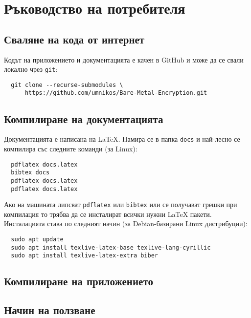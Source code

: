 \chapter{Ръководство на потребителя}
  \section{Сваляне на кода от интернет}
  Кодът на приложението и документацията е качен в GitHub и може да се свали локално чрез {\tt git}:
  \begin{lstlisting}
  git clone --recurse-submodules \
      https://github.com/umnikos/Bare-Metal-Encryption.git
  \end{lstlisting}

  \section{Компилиране на документацията}
  Документацията е написана на \LaTeX{}. Намира се в папка {\tt docs} и най-лесно се компилира със следните команди (за Linux):
  \begin{lstlisting}
  pdflatex docs.latex
  bibtex docs
  pdflatex docs.latex
  pdflatex docs.latex
  \end{lstlisting}
  Ако на машината липсват {\tt pdflatex} или {\tt bibtex} или се получават грешки при компилация то трябва да се инсталират всички нужни \LaTeX{} пакети. Инсталацията става по следният начин (за Debian-базирани Linux дистрибуции):
  \begin{lstlisting}
  sudo apt update
  sudo apt install texlive-latex-base texlive-lang-cyrillic
  sudo apt install texlive-latex-extra biber
  \end{lstlisting}

  \section{Компилиране на приложението}

  \section{Начин на ползване}
